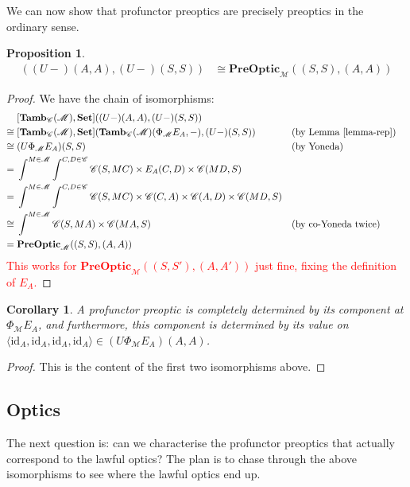 \documentclass[11pt,a4paper]{article}
\theoremstyle{plain}
\newtheorem{proposition}[theorem]{Proposition}
\newtheorem{corollary}[theorem]{Corollary}
\theoremstyle{definition}
\newcommand{\C}{\mathscr{C}}
\newcommand{\M}{\mathscr{M}}
\newcommand{\Pastro}{\Phi}
\newcommand{\Set}{\mathbf{Set}}
\newcommand{\PreOptic}{\mathbf{PreOptic}}
\newcommand{\Tamb}{\mathbf{Tamb}}
\newcommand{\id}{\mathrm{id}}
\newcommand{\todo}[1]{\textcolor{red}{\small #1}}
\begin{document}
We can now show that profunctor preoptics are precisely preoptics in the ordinary sense.

\begin{proposition}
\label{prop-profunctor-optics-are-optics}
\begin{align*}
[\Tamb_\C(\M), \Set]((U-)(A,A),(U-)(S,S)) &\cong \PreOptic_\M((S, S), (A, A))
\end{align*}
\end{proposition}
\begin{proof}
We have the chain of isomorphisms:
\begin{align*}
&[\Tamb_\C(\M), \Set]((U-)(A,A),(U-)(S,S)) \\
\cong \;&[\Tamb_\C(\M), \Set](\Tamb_\C(\M)(\Pastro_\M E_A, -), (U-)(S,S))  && \text{(by Lemma \ref{lemma-rep})}\\
\cong \;&(U\Pastro_\M E_A)(S,S)  && \text{(by Yoneda)} \\
= \;&\int^{M \in \M} \int^{C,D \in \C} \C(S, MC) \times E_A(C,D) \times \C(MD,S) \\
= \;&\int^{M \in \M} \int^{C,D \in \C} \C(S, MC) \times \C(C,A) \times \C(A,D) \times \C(MD,S) \\
\cong \;&\int^{M \in \M} \C(S, MA) \times \C(MA, S)  && \text{(by co-Yoneda twice)} \\
= \;&\PreOptic_\M((S, S), (A, A))
\end{align*}
\todo{This works for $\PreOptic_\M((S, S'), (A, A'))$ just fine, fixing the definition of $E_A$.}
\end{proof}

\begin{corollary}
A profunctor preoptic is completely determined by its component at $\Pastro_\M E_A$, and furthermore, this component is determined by its value on $\langle \id_A, \id_A, \id_A, \id_A \rangle \in (U \Pastro_\M E_A)(A, A)$.
\end{corollary}
\begin{proof}
This is the content of the first two isomorphisms above.
\end{proof}

\subsection{Optics}

The next question is: can we characterise the profunctor preoptics that actually correspond to the lawful optics? The plan is to chase through the above isomorphisms to see where the lawful optics end up.
\end{document}
